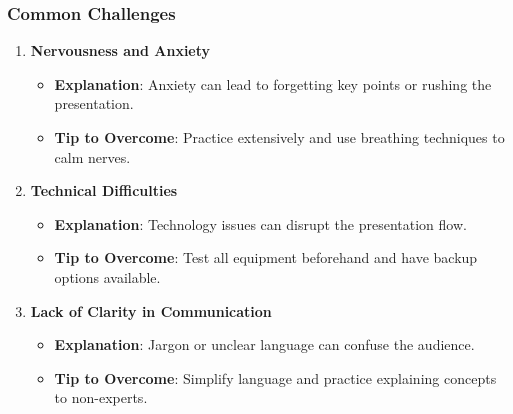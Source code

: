 \documentclass{beamer}
\begin{document}
\begin{frame}[fragile]
    \frametitle{Common Challenges}
    \begin{enumerate}
        \item \textbf{Nervousness and Anxiety}
            \begin{itemize}
                \item \textbf{Explanation}: Anxiety can lead to forgetting key points or rushing the presentation.
                \item \textbf{Tip to Overcome}: Practice extensively and use breathing techniques to calm nerves.
            \end{itemize}
        
        \item \textbf{Technical Difficulties}
            \begin{itemize}
                \item \textbf{Explanation}: Technology issues can disrupt the presentation flow.
                \item \textbf{Tip to Overcome}: Test all equipment beforehand and have backup options available.
            \end{itemize}
        
        \item \textbf{Lack of Clarity in Communication}
            \begin{itemize}
                \item \textbf{Explanation}: Jargon or unclear language can confuse the audience.
                \item \textbf{Tip to Overcome}: Simplify language and practice explaining concepts to non-experts.
            \end{itemize}
    \end{enumerate}
\end{frame}
\end{document}
